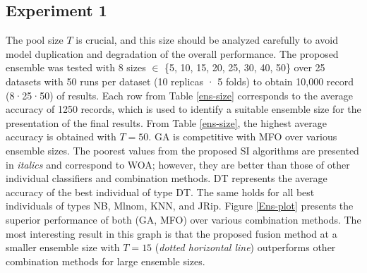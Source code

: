 


\subsection{Experiment 1}
\label{sec:4_6_Expresults}

The pool size $T$ is crucial, and this size should be analyzed carefully to avoid model duplication and degradation of the overall performance. The proposed ensemble was tested with 8 sizes $\in$ \{5, 10, 15, 20, 25, 30, 40, 50\} over 25 datasets with 50 runs per dataset (10 replicas · 5 folds) to obtain  10,000 record (8·25·50) of results. Each row from Table \ref{ens-size} corresponds to the average accuracy of 1250 records, which is used to identify a suitable ensemble size for the presentation of the final results.
From Table \ref{ens-size}, the highest average accuracy is obtained with $T=50$. GA is competitive with MFO over various ensemble sizes. The poorest values from the proposed SI algorithms are presented in \textit{italics} and correspond to WOA; however, they are better than those of other individual classifiers and combination methods. DT represents the average accuracy of the best individual of type DT. The same holds for all best individuals of types NB, Mlnom, KNN, and JRip. Figure \ref{Ens-plot} presents the superior performance of both (GA, MFO) over various combination methods. The most interesting result in this graph is that the proposed fusion method at a smaller ensemble size with $T=15$ (\textit{dotted horizontal line}) outperforms other combination methods for large ensemble sizes.



